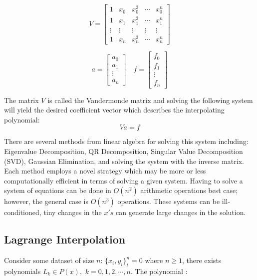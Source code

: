 \documentclass[11pt]{article}%
\begin{document}
\begin{equation}
V = \begin{bmatrix}
1 & x_0 & x_0^2 & \cdots & x_0^n\\
1 & x_1 & x_1^2 & \cdots & x_1^n\\
\vdots & \vdots & \vdots & \vdots & \vdots\\
1 & x_n & x_n^2 & \cdots & x_n^n
\end{bmatrix}
\end{equation}

\begin{equation}
a = \begin{bmatrix} a_0\\a_1\\ \vdots\\a_n\end{bmatrix}
\quad %
f = \begin{bmatrix} f_0\\f_1\\ \vdots\\f_n\end{bmatrix}
\end{equation}
%

The matrix $V$ is called the Vandermonde matrix and solving the following system will yield the desired coefficient vector which describes the interpolating polynomial:
\begin{equation}\label{DirectEq}
Va = f
\end{equation}

There are several methods from linear algebra for solving this system including: Eigenvalue Decomposition, QR Decomposition, Singular Value Decomposition (SVD), Gaussian Elimination, and solving the system with the inverse matrix. Each method employs a novel strategy which may be more or less computationally efficient in terms of solving a given system. Having to solve a system of equations can be done in $O(n^2)$ arithmetic operations best case; however, the general case is $O(n^3)$ operations. These systems can be ill-conditioned, tiny changes in the $x's$ can generate large changes in the solution.

\subsection{Lagrange Interpolation}

Consider some dataset of size $n$: $\{x_i,y_i\}^n_i=0$ where $n \geq 1$, there exists polynomials $L_k \in P(x),$ $k = 0,1,2,\cdots, n$. The polynomial \cite{LHK3}:
\end{document}
